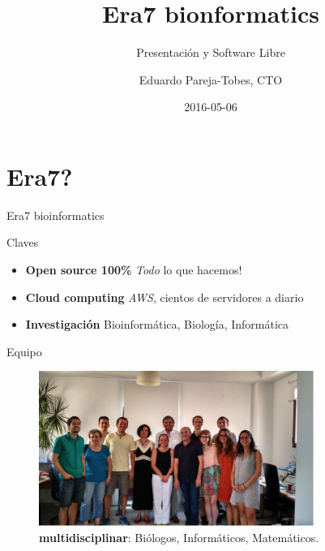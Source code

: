 \documentclass[12pt,compress]{beamer}
\title{Era7 bionformatics}
\subtitle{Presentación y Software Libre}
\author{Eduardo Pareja-Tobes, CTO}
\date{2016-05-06}
\institute{
  \href{http://era7bioinformatics.com}{{Era7} {\color{Grey-Light}bioinformatics}} - {\color{Salmon-Dark}oh}{\color{LightAmber-Dark}no}{\color{Grey}sequences}{\color{Salmon-Dark}!}
}
\let\OldHref\href
\renewcommand{\href}[2]{\OldHref[pdfnewwindow]{#1}{{\textbf{#2}}}}
\providecommand{\tightlist}{%
\setlength{\itemsep}{0pt}\setlength{\parskip}{0pt}}
\begin{document}
\maketitle


% 
\section{Era7?}\label{era7}

\begin{frame}{Era7 bioinformatics}


\begin{block}{Claves}

\begin{itemize}
\tightlist
\item
  \textbf{Open source 100\%} \emph{Todo} lo que hacemos!
\item
  \textbf{Cloud computing} \emph{AWS}, cientos de servidores a diario
\item
  \textbf{Investigación} Bioinformática, Biología, Informática
\end{itemize}

\end{block}

\end{frame}

\begin{frame}{Equipo}

\begin{figure}[htbp]
\centering
\includegraphics[width=0.80000\textwidth]{images/equipo.jpg}
\caption{\textbf{multidisciplinar}: Biólogos, Informáticos,
Matemáticos.}
\end{figure}

\end{frame}
\end{document}
